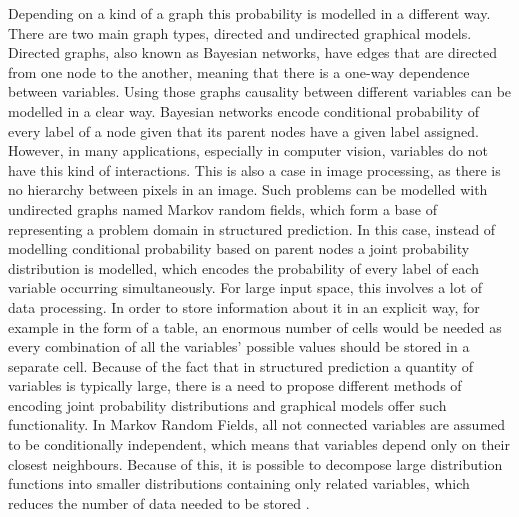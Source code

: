 Depending on a kind of a graph this probability is modelled in a different way. There are two main graph types, directed and undirected graphical models. Directed graphs, also known as Bayesian networks, have edges that are directed from one node to the another, meaning that there is a one-way dependence between variables. Using those graphs causality between different variables can be modelled in a clear way. Bayesian networks encode conditional probability of every label of a node given that its parent nodes have a given label assigned.  However, in many applications, especially in computer vision, variables do not have this kind of interactions. This is also a case in image processing, as there is no hierarchy between pixels in an image. Such problems can be modelled with undirected graphs named Markov random fields, which form a base of representing a problem domain in structured prediction. In this case,  instead of modelling conditional probability based on parent nodes a joint probability distribution is modelled, which encodes the probability of every label of each variable occurring simultaneously. For large input space, this involves a lot of data processing. In order to store information about it in an explicit way, for example in the form of a table, an enormous number of cells would be needed as every combination of all the variables’ possible values should be stored in a separate cell. Because of the fact that in structured prediction a quantity of variables is typically large, there is a need to propose different methods of encoding joint probability distributions and graphical models offer such functionality. In Markov Random Fields, all not connected variables are assumed to be conditionally independent, which means that variables depend only on their closest neighbours. Because of this, it is possible to decompose large distribution functions into smaller distributions containing only related variables, which reduces the number of data needed to be stored \cite{causality_pearl}. 
